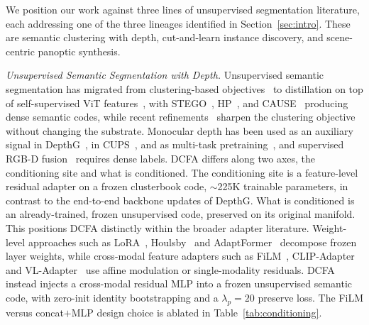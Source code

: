 \documentclass{article}
\renewcommand{\paragraph}[1]{\par\smallskip\noindent\textit{#1}\hspace{0.5em}\ignorespaces}
\begin{document}
We position our work against three lines of unsupervised segmentation literature, each addressing one of the three lineages identified in Section~\ref{sec:intro}. These are semantic clustering with depth, cut-and-learn instance discovery, and scene-centric panoptic synthesis.

\paragraph{Unsupervised Semantic Segmentation with Depth.}
Unsupervised semantic segmentation has migrated from clustering-based objectives~\cite{ji2019iic,cho2021picie} to distillation on top of self-supervised ViT features~\cite{caron2021dino,oquab2024dinov2}, with STEGO~\cite{hamilton2022stego}, HP~\cite{seong2023hp}, and CAUSE~\cite{kim2024cause} producing dense semantic codes, while recent refinements~\cite{kim2024eagle,seong2024ppap,couairon2024diffcut,bonnet2024hierarchy} sharpen the clustering objective without changing the substrate. Monocular depth has been used as an auxiliary signal in DepthG~\cite{sick2024depthg}, in CUPS~\cite{hahn2025cups}, and as multi-task pretraining~\cite{hoyer2021threeways}, and supervised RGB-D fusion~\cite{li2025dformerv2} requires dense labels. DCFA differs along two axes, the conditioning site and what is conditioned. The conditioning site is a feature-level residual adapter on a frozen clusterbook code, $\sim$225K trainable parameters, in contrast to the end-to-end backbone updates of DepthG. What is conditioned is an already-trained, frozen unsupervised code, preserved on its original manifold. This positions DCFA distinctly within the broader adapter literature. Weight-level approaches such as LoRA~\cite{hu2022lora}, Houlsby~\cite{houlsby2019adapter} and AdaptFormer~\cite{chen2022adaptformer} decompose frozen layer weights, while cross-modal feature adapters such as FiLM~\cite{perez2018film}, CLIP-Adapter~\cite{gao2023clipadapter} and VL-Adapter~\cite{sung2022vladapter} use affine modulation or single-modality residuals. DCFA instead injects a cross-modal residual MLP into a frozen unsupervised semantic code, with zero-init identity bootstrapping and a $\lambda_p{=}20$ preserve loss. The FiLM versus concat$+$MLP design choice is ablated in Table~\ref{tab:conditioning}.
\end{document}
